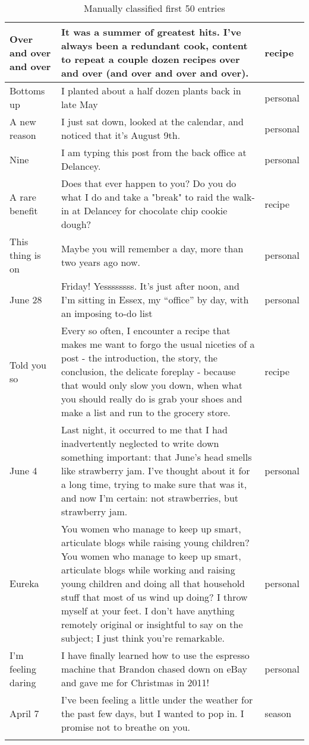 \documentclass[12pt]{article}
\begin{document}
\begin{longtable}{ | p{3.0cm} | p{12.0cm} |p{2.0cm}| }
Over and over and over & It was a summer of greatest hits. I’ve always been a redundant cook, content to repeat a couple dozen recipes over and over (and over and over and over). &  recipe \\\hline

Bottoms up & I planted about a half dozen plants back in late May &  personal \\\hline
A new reason & I just sat down, looked at the calendar, and noticed that it’s August 9th. & personal\\\hline

Nine & I am typing this post from the back office at Delancey. &personal  \\\hline
A rare benefit & Does that ever happen to you? Do you do what I do and take a "break" to raid the walk-in at Delancey for chocolate chip cookie dough? & recipe\\\hline

 This thing is on&Maybe you will remember a day, more than two years ago now.  & personal  \\\hline 
 
June 28 &  Friday!  Yessssssss. It’s just after noon, and I’m sitting in Essex, my “office” by day, with an imposing to-do list& personal  \\\hline
Told you so & Every so often, I encounter a recipe that makes me want to forgo the usual niceties of a post - the introduction, the story, the conclusion, the delicate foreplay - because that would only slow you down, when what you should really do is grab your shoes and make a list and run to the grocery store.   & recipe  \\\hline

June 4 &Last night, it occurred to me that I had inadvertently neglected to write down something important: that June’s head smells like strawberry jam. I’ve thought about it for a long time, trying to make sure that was it, and now I’m certain: not strawberries, but strawberry jam. & personal  \\\hline

Eureka &You women who manage to keep up smart, articulate blogs while raising young children? You women who manage to keep up smart, articulate blogs while working and raising young children and doing all that household stuff that most of us wind up doing? I throw myself at your feet.  I don’t have anything remotely original or insightful to say on the subject; I just think you’re remarkable.  &  personal \\\hline
I'm feeling daring & I have finally learned how to use the espresso machine that Brandon chased down on eBay and gave me for Christmas in 2011!  & personal  \\\hline
April 7 & I’ve been feeling a little under the weather for the past few days, but I wanted to pop in. I promise not to breathe on you. &  season \\\hline

\caption{Manually classified first 50 entries}
\end{longtable}
\end{document}
